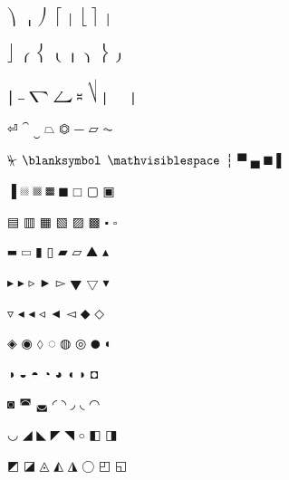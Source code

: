 \documentclass{article}
\begin{document}
$\rparenuend$ $\rparenextender$ $\rparenlend$ $\lbrackuend$ $\lbrackextender$ $\lbracklend$ $\rbrackuend$ $\rbrackextender$ \par
$\rbracklend$ $\lbraceuend$ $\lbracemid$ $\lbracelend$ $\vbraceextender$ $\rbraceuend$ $\rbracemid$ $\rbracelend$ \par
$\intextender$ $\harrowextender$ $\sumtop$ $\sumbottom$ $\bbrktbrk$ $\sqrtbottom$ $\lvboxline$ $\rvboxline$ \par
$\varcarriagereturn$ $\obrbrak$ $\ubrbrak$ $\trapezium$ $\benzenr$ $\strns$ $\fltns$ $\accurrent$ \par
$\elinters$ $\blanksymbol$ $\mathvisiblespace$ $\bdtriplevdash$ $\blockuphalf$ $\blocklowhalf$ $\blockfull$ $\blocklefthalf$ \par
$\blockrighthalf$ $\blockqtrshaded$ $\blockhalfshaded$ $\blockthreeqtrshaded$ $\mdlgblksquare$ $\mdlgwhtsquare$ $\squoval$ $\blackinwhitesquare$ \par
$\squarehfill$ $\squarevfill$ $\squarehvfill$ $\squarenwsefill$ $\squareneswfill$ $\squarecrossfill$ $\smblksquare$ $\smwhtsquare$ \par
$\hrectangleblack$ $\hrectangle$ $\vrectangleblack$ $\vrectangle$ $\parallelogramblack$ $\parallelogram$ $\bigblacktriangleup$ $\blacktriangle$ \par
$\blacktriangleright$ $\smallblacktriangleright$ $\smalltriangleright$ $\blackpointerright$ $\whitepointerright$ $\bigblacktriangledown$ $\bigtriangledown$ $\blacktriangledown$ \par
$\triangledown$ $\blacktriangleleft$ $\smallblacktriangleleft$ $\smalltriangleleft$ $\blackpointerleft$ $\whitepointerleft$ $\mdlgblkdiamond$ $\mdlgwhtdiamond$ \par
$\blackinwhitediamond$ $\fisheye$ $\mdlgwhtlozenge$ $\dottedcircle$ $\circlevertfill$ $\bullseye$ $\mdlgblkcircle$ $\circlelefthalfblack$ \par
$\circlerighthalfblack$ $\circlebottomhalfblack$ $\circletophalfblack$ $\circleurquadblack$ $\blackcircleulquadwhite$ $\blacklefthalfcircle$ $\blackrighthalfcircle$ $\inversebullet$ \par
$\inversewhitecircle$ $\invwhiteupperhalfcircle$ $\invwhitelowerhalfcircle$ $\ularc$ $\urarc$ $\lrarc$ $\llarc$ $\topsemicircle$ \par
$\botsemicircle$ $\lrblacktriangle$ $\llblacktriangle$ $\ulblacktriangle$ $\urblacktriangle$ $\smwhtcircle$ $\squareleftblack$ $\squarerightblack$ \par
$\squareulblack$ $\squarelrblack$ $\trianglecdot$ $\triangleleftblack$ $\trianglerightblack$ $\lgwhtcircle$ $\squareulquad$ $\squarellquad$ \par
\end{document}
